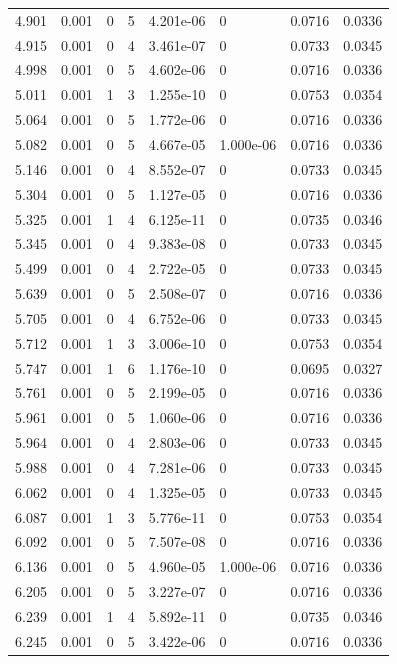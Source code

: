 \documentclass[preview]{standalone}
\begin{document}
{{{\begin{tabular}{L{1.2cm}C{1.2cm} C{0.3cm}C{0.5cm} C{1.4cm}C{1.4cm} C{1.4cm}C{1.4cm}}
  4.901  &  0.001  & 0     &  5 &  4.201e-06  & 0  & 0.0716 &  0.0336   \\ 
  4.915  &  0.001  & 0     &  4 &  3.461e-07  & 0  & 0.0733 &  0.0345   \\ 
  4.998  &  0.001  & 0     &  5 &  4.602e-06  & 0  & 0.0716 &  0.0336   \\ 
  5.011  &  0.001  & 1     &  3 &  1.255e-10  & 0  & 0.0753 &  0.0354   \\ 
  5.064  &  0.001  & 0     &  5 &  1.772e-06  & 0  & 0.0716 &  0.0336   \\ 
  5.082  &  0.001  & 0     &  5 &  4.667e-05  & 1.000e-06  & 0.0716 &  0.0336   \\ 
  5.146  &  0.001  & 0     &  4 &  8.552e-07  & 0  & 0.0733 &  0.0345   \\ 
  5.304  &  0.001  & 0     &  5 &  1.127e-05  & 0  & 0.0716 &  0.0336   \\ 
  5.325  &  0.001  & 1     &  4 &  6.125e-11  & 0  & 0.0735 &  0.0346   \\ 
  5.345  &  0.001  & 0     &  4 &  9.383e-08  & 0  & 0.0733 &  0.0345   \\ 
  5.499  &  0.001  & 0     &  4 &  2.722e-05  & 0  & 0.0733 &  0.0345   \\ 
  5.639  &  0.001  & 0     &  5 &  2.508e-07  & 0  & 0.0716 &  0.0336   \\ 
  5.705  &  0.001  & 0     &  4 &  6.752e-06  & 0  & 0.0733 &  0.0345   \\ 
  5.712  &  0.001  & 1     &  3 &  3.006e-10  & 0  & 0.0753 &  0.0354   \\ 
  5.747  &  0.001  & 1     &  6 &  1.176e-10  & 0  & 0.0695 &  0.0327   \\ 
  5.761  &  0.001  & 0     &  5 &  2.199e-05  & 0  & 0.0716 &  0.0336   \\ 
  5.961  &  0.001  & 0     &  5 &  1.060e-06  & 0  & 0.0716 &  0.0336   \\ 
  5.964  &  0.001  & 0     &  4 &  2.803e-06  & 0  & 0.0733 &  0.0345   \\ 
  5.988  &  0.001  & 0     &  4 &  7.281e-06  & 0  & 0.0733 &  0.0345   \\ 
  6.062  &  0.001  & 0     &  4 &  1.325e-05  & 0  & 0.0733 &  0.0345   \\ 
  6.087  &  0.001  & 1     &  3 &  5.776e-11  & 0  & 0.0753 &  0.0354   \\ 
  6.092  &  0.001  & 0     &  5 &  7.507e-08  & 0  & 0.0716 &  0.0336   \\ 
  6.136  &  0.001  & 0     &  5 &  4.960e-05  & 1.000e-06  & 0.0716 &  0.0336   \\ 
  6.205  &  0.001  & 0     &  5 &  3.227e-07  & 0  & 0.0716 &  0.0336   \\ 
  6.239  &  0.001  & 1     &  4 &  5.892e-11  & 0  & 0.0735 &  0.0346   \\ 
  6.245  &  0.001  & 0     &  5 &  3.422e-06  & 0  & 0.0716 &  0.0336   \\ 
\hline 
\end{tabular} 

}}}
\end{document}
